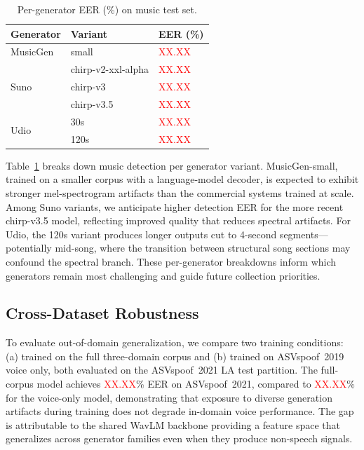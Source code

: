\documentclass[10pt,twocolumn,a4paper]{article}
\newcommand{\NUM}{\textcolor{red}{XX.XX}}
\begin{document}
\begin{table}[t]
\centering
\caption{Per-generator EER (\%) on music test set.}
\label{tab:music_generators}
\small
\begin{tabular}{@{}lll@{}}
\toprule
\textbf{Generator} & \textbf{Variant} & \textbf{EER (\%)} \\
\midrule
MusicGen & small & \NUM \\
\midrule
\multirow{3}{*}{Suno} & chirp-v2-xxl-alpha & \NUM \\
                     & chirp-v3 & \NUM \\
                     & chirp-v3.5 & \NUM \\
\midrule
\multirow{2}{*}{Udio} & 30s & \NUM \\
                     & 120s & \NUM \\
\bottomrule
\end{tabular}
\end{table}

Table~\ref{tab:music_generators} breaks down music detection per generator variant. MusicGen-small, trained on a smaller corpus with a language-model decoder, is expected to exhibit stronger mel-spectrogram artifacts than the commercial systems trained at scale. Among Suno variants, we anticipate higher detection EER for the more recent chirp-v3.5 model, reflecting improved quality that reduces spectral artifacts. For Udio, the 120s variant produces longer outputs cut to 4-second segments---potentially mid-song, where the transition between structural song sections may confound the spectral branch. These per-generator breakdowns inform which generators remain most challenging and guide future collection priorities.

\subsection{Cross-Dataset Robustness}

To evaluate out-of-domain generalization, we compare two training conditions: (a) trained on the full three-domain corpus and (b) trained on ASVspoof~2019 voice only, both evaluated on the ASVspoof~2021 LA test partition. The full-corpus model achieves \NUM\% EER on ASVspoof~2021, compared to \NUM\% for the voice-only model, demonstrating that exposure to diverse generation artifacts during training does not degrade in-domain voice performance. The gap is attributable to the shared WavLM backbone providing a feature space that generalizes across generator families even when they produce non-speech signals.
\end{document}
